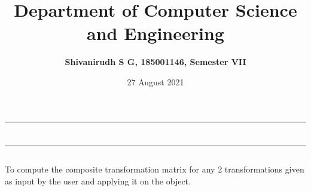 \documentclass[9pt,letterpaper]{article}
\title{\textbf{Department of Computer Science and Engineering}}
\author{\textbf{Shivanirudh S G, 185001146, Semester VII }}
\date{27 August 2021}
\begin{document}
\maketitle
\hrule
\section*{}
\hrule 
\bigskip\bigskip

\subsection*{}

\subsection*{}
\begin{flushleft}
     To compute the composite transformation matrix for any 2 transformations given as input by the user and applying it on the object.
\end{flushleft}

\subsection*{}
\begin{flushleft}




\end{flushleft}
\newpage
\end{document}
